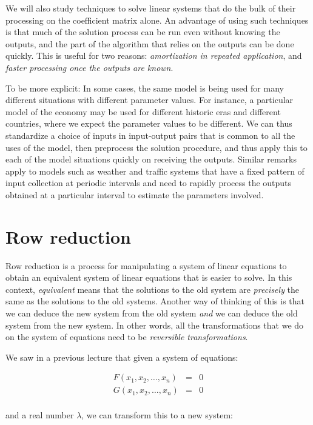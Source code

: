 \documentclass[10pt]{amsart}
\begin{document}
We will also study techniques to solve linear systems that do the bulk
of their processing on the coefficient matrix alone. An advantage of
using such techniques is that much of the solution process can be run
even without knowing the outputs, and the part of the algorithm that
relies on the outputs can be done quickly. This is useful for two
reasons: {\em amortization in repeated application}, and {\em faster
  processing once the outputs are known}.

To be more explicit: In some cases, the same model is being used for
many different situations with different parameter values. For
instance, a particular model of the economy may be used for different
historic eras and different countries, where we expect the parameter
values to be different. We can thus standardize a choice of inputs in
input-output pairs that is common to all the uses of the model, then
preprocess the solution procedure, and thus apply this to each of the
model situations quickly on receiving the outputs. Similar remarks
apply to models such as weather and traffic systems that have a fixed
pattern of input collection at periodic intervals and need to rapidly
process the outputs obtained at a particular interval to estimate the
parameters involved.

\section{Row reduction}

Row reduction is a process for manipulating a system of linear
equations to obtain an equivalent system of linear equations that is
easier to solve. In this context, {\em equivalent} means that the
solutions to the old system are {\em precisely} the same as the
solutions to the old systems. Another way of thinking of this is that
we can deduce the new system from the old system {\em and} we can
deduce the old system from the new system. In other words, all the
transformations that we do on the system of equations need to be {\em
  reversible transformations}.

We saw in a previous lecture that given a system of equations:

\begin{eqnarray*}
  F(x_1,x_2,\dots,x_n) & =  & 0\\
  G(x_1,x_2,\dots,x_n) & = & 0\\
\end{eqnarray*}

and a real number $\lambda$, we can transform this to a new system:
\end{document}
